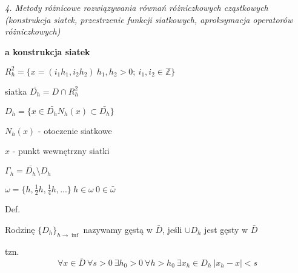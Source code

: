 \textit{4. Metody różnicowe rozwiązywania równań różniczkowych cząstkowych (konstrukcja siatek, przestrzenie funkcji siatkowych, aproksymacja operatorów różniczkowych)}

\textbf{a\) konstrukcja siatek}

$R^{2}_{h} = \{ x = (i_{1}h_{1}, i_{2}h_{2})\ h_{1},h_{2} > 0;\ i_{1},i_{2} \in \mathbb{Z}\}$

siatka $\bar{D_{h}} = D \cap R^{2}_{h}$

$D_{h} = \{ x \in \bar{D_{h}} N_h(x) \subset \bar{D_{h}}\}$

$N_h(x)$ - otoczenie siatkowe

$x$ - punkt wewnętrzny siatki

$\Gamma_h = \bar{D_h} \setminus D_h$

$\omega = \{h, \frac{1}{2}h, \frac{1}{4}h, ...\}\ h \in \omega\ 0 \in \bar{\omega}$

Def.

Rodzinę $\{D_h\}_{h \rightarrow \inf}$ nazywamy gęstą w $\bar{D}$, jeśli $\cup D_h$ jest gęsty w $\bar{D}$

tzn.
\[\forall x \in \bar{D}\ \forall s > 0\ \exists h_0 > 0\ \forall h > h_0\ \exists x_h \in D_h\ |x_h - x| < s\]